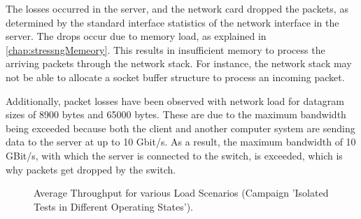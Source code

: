 The losses occurred in the server, and the network card dropped the packets, as determined by the standard interface statistics of the network interface in the server. The drops occur due to memory load, as explained in \ref{chap:stressngMemeory}. This results in insufficient memory to process the arriving packets through the network stack. For instance, the network stack may not be able to allocate a socket buffer structure to process an incoming packet.

Additionally, packet losses have been observed with network load for datagram sizes of 8900 bytes and 65000 bytes. These are due to the maximum bandwidth being exceeded because both the client and another computer system are sending data to the server at up to 10 Gbit/s. As a result, the maximum bandwidth of 10 GBit/s, with which the server is connected to the switch, is exceeded, which is why packets get dropped by the switch.

\begin{figure}[htbp]
  \centering
  \caption{Average Throughput for various Load Scenarios (Campaign 'Isolated Tests in Different Operating States').}
  \label{fig:resuc2}
\end{figure}

